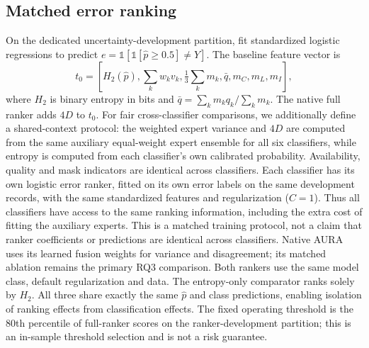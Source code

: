 \documentclass[conference]{IEEEtran}
\begin{document}
\subsection{Matched error ranking}
On the dedicated uncertainty-development partition, fit standardized logistic regressions to predict $e=\mathbb{1}[\mathbb{1}[\hat p\geq0.5]\neq Y]$. The baseline feature vector is
\begin{equation}
 t_0=[H_2(\hat p),\sum_kw_kv_k,\tfrac{1}{3}\sum_km_k,\bar q,m_C,m_L,m_I],
\end{equation}
where $H_2$ is binary entropy in bits and $\bar q=\sum_k m_k q_k/\sum_km_k$. The native full ranker adds $4D$ to $t_0$. For fair cross-classifier comparisons, we additionally define a shared-context protocol: the weighted expert variance and $4D$ are computed from the same auxiliary equal-weight expert ensemble for all six classifiers, while entropy is computed from each classifier's own calibrated probability. Availability, quality and mask indicators are identical across classifiers. Each classifier has its own logistic error ranker, fitted on its own error labels on the same development records, with the same standardized features and regularization ($C=1$). Thus all classifiers have access to the same ranking information, including the extra cost of fitting the auxiliary experts. This is a matched training protocol, not a claim that ranker coefficients or predictions are identical across classifiers. Native AURA uses its learned fusion weights for variance and disagreement; its matched ablation remains the primary RQ3 comparison. Both rankers use the same model class, default regularization and data. The entropy-only comparator ranks solely by $H_2$. All three share exactly the same $\hat p$ and class predictions, enabling isolation of ranking effects from classification effects. The fixed operating threshold is the 80th percentile of full-ranker scores on the ranker-development partition; this is an in-sample threshold selection and is not a risk guarantee.
\end{document}
